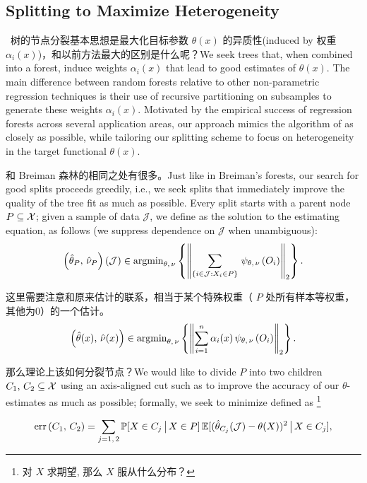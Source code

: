 \documentclass[aos]{imsart}
\theoremstyle{plain}
\theoremstyle{definition}
\theoremstyle{remark}
\begin{document}
\begin{CJK}{UTF8}{gbsn}
\subsection{Splitting to Maximize Heterogeneity} \, 树的节点分裂基本思想是最大化目标参数 $\theta(x)$ 的异质性(induced by 权重 $\alpha_i(x)$)，和以前方法最大的区别是什么呢？We seek trees that, when combined into a forest, induce weights
$\alpha_i(x)$ that lead to good estimates of $\theta(x)$. The main difference between
random forests relative to other non-parametric regression techniques
is their use of recursive partitioning on subsamples to generate these weights $\alpha_i(x)$.
Motivated by the empirical success of regression forests across several application areas, our approach
mimics the algorithm of \citet{breiman2001random} as closely as possible, while tailoring
our splitting scheme to focus on heterogeneity in the target functional $\theta(x)$.

和 Breiman 森林的相同之处有很多。Just like in Breiman's forests, our search for good splits proceeds greedily, i.e., we seek splits that
immediately improve the quality of the tree fit as much as possible.
Every split starts with a parent node $P \subseteq \mathcal{X}$; given a sample of data $\mathcal{J}$, we define
 as the solution to the estimating equation, as follows
(we suppress dependence on $\mathcal{J}$ when unambiguous):
\begin{equation}
\label{eq:leaf_solve}
\p{\htheta_P, \, \hnu_P}(\mathcal{J}) \in \argmin_{\theta, \, \nu} \cb{\Norm{\sum_{\cb{i\in\mathcal{J} : X_i \in P}} \, \psi_{\theta, \, \nu}\p{O_i}}_2}.
\end{equation}

这里需要注意和原来估计的联系，相当于某个特殊权重（ $P$ 处所有样本等权重，其他为0）的一个估计。
\begin{equation*}
\p{\htheta(x), \, \hnu(x)} \in \argmin_{\theta, \, \nu} \cb{\Norm{\sum_{i = 1}^n \alpha_i(x) \, \psi_{\theta, \, \nu}\p{O_i}}_2}.     
\end{equation*}


那么理论上该如何分裂节点？We would like to divide $P$ into two children $C_1, \, C_2 \subseteq \mathcal{X}$ using an axis-aligned
cut such as to improve the accuracy of our $\theta$-estimates as much as possible;
formally, we seek to minimize  defined as \footnote{对 $X$ 求期望, 那么 $X$ 服从什么分布？}

\begin{equation*}
\label{eq:err_criterion}
\err\p{C_1, \, C_2} = \sum_{j = 1, \, 2}
 \mathbb{P}[X \in C_j \cond X \in P] \, \mathbb{E}[(\htheta_{C_j}(\mathcal{J}) - \theta(X))^2 \cond X \in C_j],
\end{equation*}


\end{CJK}
\end{document}
